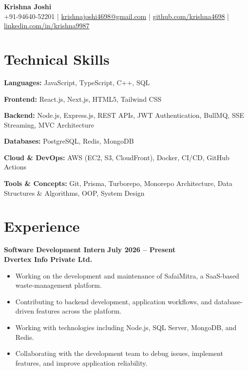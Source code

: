\documentclass[10pt,a4paper]{article}
\begin{document}
\begin{center}
    {\LARGE \textbf{Krishna Joshi}} \\[3pt]
    +91-94640-52201 \;|\;
    \href{mailto:krishnajoshi4698@gmail.com}{krishnajoshi4698@gmail.com}
    \;|\;
    \href{https://github.com/krishna4698}{github.com/krishna4698}
    \;|\;
    \href{https://linkedin.com/in/krishna9987}{linkedin.com/in/krishna9987}
\end{center}

\section{Technical Skills}

\textbf{Languages:} JavaScript, TypeScript, C++, SQL

\textbf{Frontend:} React.js, Next.js, HTML5, Tailwind CSS

\textbf{Backend:} Node.js, Express.js, REST APIs, JWT Authentication, BullMQ, SSE Streaming, MVC Architecture

\textbf{Databases:} PostgreSQL, Redis, MongoDB

\textbf{Cloud \& DevOps:} AWS (EC2, S3, CloudFront), Docker, CI/CD, GitHub Actions

\textbf{Tools \& Concepts:} Git, Prisma, Turborepo, Monorepo Architecture, Data Structures \& Algorithms, OOP, System Design

\section{Experience}

\textbf{Software Development Intern} \hfill \textbf{July 2026 -- Present}\\
\textbf{Dvertex Info Private Ltd.}

\begin{itemize}
    \item Working on the development and maintenance of SafaiMitra, a SaaS-based waste-management platform.
    \item Contributing to backend development, application workflows, and database-driven features across the platform.
    \item Working with technologies including Node.js, SQL Server, MongoDB, and Redis.
    \item Collaborating with the development team to debug issues, implement features, and improve application reliability.
\end{itemize}
\end{document}
